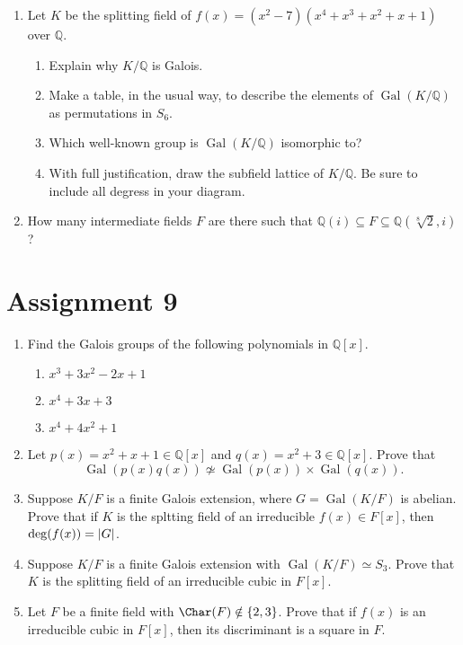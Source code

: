 \documentclass[notoc,notitlepage,nobib]{tufte-book}
\DeclareMathOperator{\Gal}{Gal}
\begin{document}
\begin{enumerate}
\begin{enumerate}
    \end{enumerate}
  \item Let $K$ be the splitting field of $f(x) = (x^2 - 7)(x^4 + x^3 + x^2 + x
    + 1)$ over $\mathbb{Q}$.
    \begin{enumerate}
      \item Explain why $K / \mathbb{Q}$ is Galois.
      \item Make a table, in the usual way, to describe the elements of
        $\Gal(K/\mathbb{Q})$ as permutations in $S_6$.
      \item Which well-known group is $\Gal(K/\mathbb{Q})$ isomorphic to?
      \item With full justification, draw the subfield lattice of
        $K/\mathbb{Q}$. Be sure to include all degress in your diagram.
    \end{enumerate}
  \item How many intermediate fields $F$ are there such that $\mathbb{Q}(i)
    \subseteq F \subseteq \mathbb{Q}(\sqrt[8]{2}, i)$?
\end{enumerate}


\section{Assignment 9}%
\label{sec:assignment_9}

\begin{enumerate}
  \item Find the Galois groups of the following polynomials in $\mathbb{Q}[x]$.
    \begin{enumerate}
      \item $x^3 + 3x^2 - 2x + 1$
      \item $x^4 + 3x + 3$
      \item $x^4 + 4x^2 + 1$
    \end{enumerate}
  \item Let $p(x) = x^2 + x + 1 \in \mathbb{Q}[x]$ and $q(x) = x^2 + 3 \in
    \mathbb{Q}[x]$. Prove that
    \begin{equation*}
      \Gal(p(x)q(x)) \not\simeq \Gal(p(x)) \times \Gal(q(x)).
    \end{equation*}
  \item Suppose $K / F$ is a finite Galois extension, where $G = \Gal(K / F)$ is
    abelian. Prove that if $K$ is the spltting field of an irreducible $f(x)
    \in F[x]$, then $\deg(f(x)) = \left|G\right|$.
  \item Suppose $K / F$ is a finite Galois extension with $\Gal(K / F) \simeq
    S_3$. Prove that $K$ is the splitting field of an irreducible cubic in
    $F[x]$.
  \item Let $F$ be a finite field with $\Char(F) \notin \{2, 3\}$. Prove that if
    $f(x)$ is an irreducible cubic in $F[x]$, then its discriminant is a square
    in $F$.
\end{enumerate}
\end{document}

